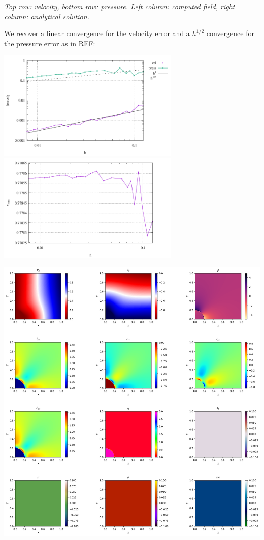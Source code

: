 \documentclass[a4paper]{article}
\begin{document}
\begin{center}
{\it Top row: velocity, bottom row: pressure. Left column: computed field, 
right column: analytical solution.}
\end{center}

We recover a linear convergence for the velocity error and a $h^{1/2}$
convergence for the pressure error as in REF:
\begin{center}
\includegraphics[width=8.7cm]{./results/benchmark_solvi/convergence.pdf}
\includegraphics[width=8.7cm]{./results/benchmark_solvi/vrms.pdf}
\end{center}

\newpage
\begin{center}
\includegraphics[width=14cm]{./results/benchmark_solvi/img_solution_0000.png}
\end{center}
\end{document}
